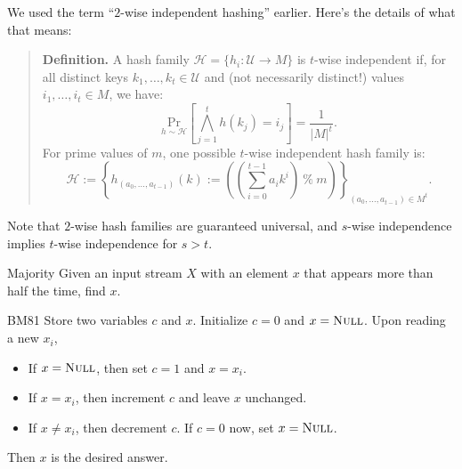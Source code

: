 \begin{remark}
    We used the term ``$2$-wise independent hashing'' earlier.  Here's the details of what that means:
    \begin{quote}
        \textbf{Definition.} A hash family $\mathcal{H} = \{h_i: \mathcal{U} \to M\}$ is $t$-wise independent if, for all distinct keys $k_1, \dots, k_t \in \mathcal{U}$ and (not necessarily distinct!) values $i_1, \dots, i_t \in M$, we have:
        \[ \underset{h \sim \mathcal{H}}{\mathrm{Pr}} \left [ \bigwedge_{j = 1}^t h(k_j) = i_j \right ] = \dfrac{1}{|M|^t}. \]
        For prime values of $m$, one possible $t$-wise independent hash family is:
        \[ \mathcal{H} := \left \{ h_{(a_0, \dots, a_{t - 1})}(k) := \left( \left(\sum_{i = 0}^{t - 1} a_i k^i\right) \ \% \ m \right) \right \}_{(a_0, \dots, a_{t - 1}) \in M^t}. \]
    \end{quote}
    Note that $2$-wise hash families are guaranteed universal, and $s$-wise independence implies $t$-wise independence for $s > t$.
\end{remark}

\begin{problem}{Majority}
    Given an input stream $X$ with an element $x$ that appears more than half the time, find $x$.
\end{problem}

\begin{solution}{BM81}
    Store two variables $c$ and $x$.  Initialize $c = 0$ and $x = \textsc{Null}$.  Upon reading a new $x_i$,
    \begin{itemize}
        \item If $x = \textsc{Null}$, then set $c = 1$ and $x = x_i$.
        \item If $x = x_i$, then increment $c$ and leave $x$ unchanged.
        \item If $x \neq x_i$, then decrement $c$.  If $c = 0$ now, set $x = \textsc{Null}$.
    \end{itemize}
    Then $x$ is the desired answer.
\end{solution}

